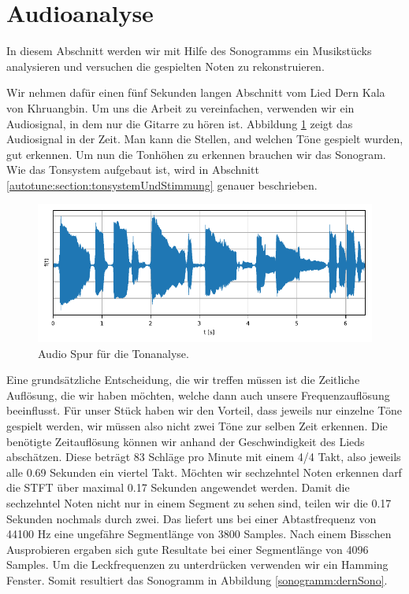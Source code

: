 %
%
%
%
\section{Audioanalyse
\label{sonogramm:section:teil2}}
In diesem Abschnitt werden wir mit Hilfe des Sonogramms ein Musikstücks
analysieren und versuchen die gespielten Noten zu rekonstruieren.

Wir nehmen dafür einen fünf Sekunden langen Abschnitt vom Lied
Dern Kala von Khruangbin.
Um uns die Arbeit zu vereinfachen, verwenden wir ein Audiosignal, in
dem nur die Gitarre zu hören ist.
Abbildung \ref{sonogramm:dernTime} zeigt das Audiosignal in der Zeit.
Man kann die Stellen, and welchen Töne gespielt wurden, gut erkennen.
Um nun die Tonhöhen zu erkennen brauchen wir das Sonogram.
Wie das Tonsystem aufgebaut ist, wird in Abschnitt \ref{autotune:section:tonsystemUndStimmung}
genauer beschrieben.
\begin{figure}
    \centering
    \includegraphics{papers/sonogramm/images/audioTimeDern.pdf}
    \caption{Audio Spur für die Tonanalyse.
    \label{sonogramm:dernTime}
    }
\end{figure}

Eine grundsätzliche Entscheidung, die wir treffen müssen
ist die Zeitliche Auflösung, die wir haben möchten, welche 
dann auch unsere Frequenzauflösung beeinflusst.
Für unser Stück haben wir den Vorteil, dass jeweils nur einzelne
Töne gespielt werden, wir müssen also nicht zwei Töne zur selben 
Zeit erkennen.
Die benötigte Zeitauflösung können wir anhand der Geschwindigkeit des Lieds abschätzen.
Diese beträgt 83 Schläge pro Minute mit einem 4/4 Takt, also jeweils alle 0.69 Sekunden ein viertel Takt.
Möchten wir sechzehntel Noten erkennen darf die STFT über maximal 0.17 Sekunden
angewendet werden.
Damit die sechzehntel Noten nicht nur in einem Segment zu sehen sind, teilen
wir die 0.17 Sekunden nochmals durch zwei.
Das liefert uns bei einer Abtastfrequenz von 44100 Hz eine ungefähre Segmentlänge von 
3800 Samples. 
Nach einem Bisschen Ausprobieren ergaben sich gute Resultate bei einer Segmentlänge
von 4096 Samples.
Um die Leckfrequenzen zu unterdrücken verwenden wir ein Hamming Fenster.
Somit resultiert das Sonogramm in Abbildung \ref{sonogramm:dernSono}.

